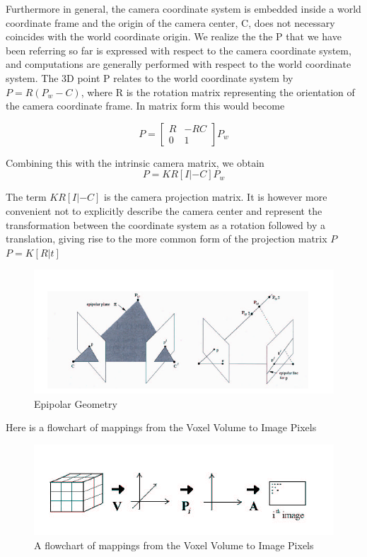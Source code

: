 \begin{enumerate}
Furthermore in general, the camera coordinate system is embedded inside a world coordinate frame and the origin of the camera center, C, does not necessary coincides with the world coordinate origin. We realize the the P that we have been referring so far is expressed with respect to the camera coordinate system, and computations are generally performed with respect to the world coordinate system. The 3D point P relates to the world coordinate system by $P = R(P_w - C)$, where R is the rotation matrix representing the orientation of the camera coordinate frame. In matrix form this would become

$$P = \begin{bmatrix} R & -RC \\ 0 & 1 \end{bmatrix} P_w$$

Combining this with the intrinsic camera matrix, we obtain
				$$ P = K R [I |- C]P_w $$

The term $K R [I |- C]$ is the camera projection matrix. It is however more convenient not to explicitly describe the camera center and represent the transformation between the coordinate system as a rotation followed by a translation, giving rise to the more common form of the projection matrix $P$
$P = K [R|t]$

\begin{figure}[htb]
\centering
\includegraphics[scale=0.8,keepaspectratio=true]{chap2/epipolar.png}
\caption{Epipolar Geometry}
\label{fig:epipolar}
\end{figure}

Here is a flowchart of mappings from the Voxel Volume to Image Pixels
\begin{figure}[htb]
\centering
\includegraphics[scale=0.8,keepaspectratio=true]{chap2/flow_chart_voxel.png}
\caption{A flowchart of mappings from the Voxel Volume to Image Pixels}
\label{fig:flow_chart_voxel}
\end{figure}


\end{enumerate}
